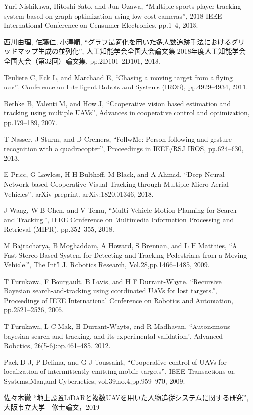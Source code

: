 \documentclass[autodetect-engine,dvipdfmx-if-dvi,ja=standard,a4j,jbase=11pt,magstyle=nomag*]{bxjsreport}
\begin{document}
% 
% 

\begin{thebibliography}{99}

Yuri Nishikawa, Hitoshi Sato, and Jun Ozawa, ``Multiple sports player tracking system based on graph optimization using low-cost cameras'', 2018 IEEE International Conference on Consumer Electronics, pp.1--4, 2018.

西川由理, 佐藤仁, 小澤順,  ``グラフ最適化を用いた多人数追跡手法におけるグリッドマップ生成の並列化'', 人工知能学会全国大会論文集 2018年度人工知能学会全国大会（第32回）論文集, pp.2D101--2D101, 2018.

Teuliere C, Eck L, and Marchand E, ``Chasing a moving target from a flying uav'', Conference on Intelligent Robots and Systems (IROS), pp.4929--4934, 2011.

Bethke B, Valenti M, and How J, ``Cooperative vision based estimation and tracking using multiple UAVs'', Advances in cooperative control and optimization, pp.179--189, 2007.

T Nasser, J Sturm, and D Cremers, ``FollwMe: Person following and gesture recognition with a quadrocopter'', Proceedings in IEEE/RSJ IROS, pp.624--630, 2013.

E Price, G Lawless, H H Bulthoff, M Black, and A Ahmad, ``Deep Neural Network-based Cooperative Visual Tracking through Multiple Micro Aerial Vehicles'', arXiv preprint, arXiv:1820.01346, 2018.

J Wang, W B Chen, and V Temu, ``Multi-Vehicle Motion Planning for Search and Tracking.'', IEEE Conference on Multimedia Information Processing and Retrieval (MIPR), pp.352--355, 2018.

M Bajracharya, B Moghaddam, A Howard, S Brennan, and L H Matthies, ``A Fast Stereo-Based System for Detecting and Tracking Pedestrians from a Moving Vehicle.'', The Int'l J. Robotics Research, Vol.28,pp.1466--1485, 2009.

T Furukawa, F Bourgault, B Lavis, and H F Durrant-Whyte, ``Recursive Bayesian search-and-tracking using coordinated UAVs for lost targets.'', Proceedings of IEEE International Conference on Robotics and Automation, pp.2521--2526, 2006.

T Furukawa, L C Mak, H Durrant-Whyte, and R Madhavan, ``Autonomous bayesian search and tracking. and its experimental validation.', Advanced Robotics, 26(5-6):pp.461--485, 2012.

Pack D J, P Delima, and G J Toussaint, ``Cooperative control of UAVs for localization of intermittently emitting mobile targets'', IEEE Transactions on Systems,Man,and Cybernetics, vol.39,no.4,pp.959--970, 2009.

佐々木徹 ``地上設置LiDARと複数UAVを用いた人物追従システムに関する研究'', 大阪市立大学　修士論文，2019

\end{thebibliography}
\end{document}
